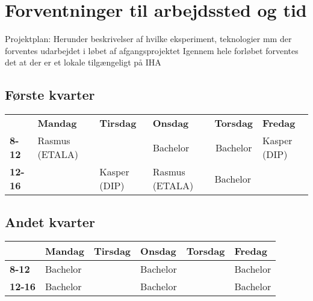 \chapter{Forventninger til arbejdssted og tid}
Projektplan: Herunder beskrivelser af hvilke eksperiment, teknologier mm der forventes udarbejdet i løbet af afgangsprojektet
Igennem hele forløbet forventes det at der er et lokale tilgængeligt på IHA
\section{Første kvarter}
\begin{table}[h]
\begin{tabular}{llllll}
               & \textbf{Mandag} & \textbf{Tirsdag} & \textbf{Onsdag} & \textbf{Torsdag}             & \textbf{Fredag} \\
\textbf{8-12}  & Rasmus (ETALA)  &                  & Bachelor        & \multicolumn{1}{c}{Bachelor} & Kasper (DIP)    \\
\textbf{12-16} &                 & Kasper (DIP)     & Rasmus (ETALA)  & Bachelor                     &                
\end{tabular}
\end{table}

\section{Andet kvarter}
\begin{table}[h]
\begin{tabular}{|l|l|l|l|l|l|}
\hline
               & \textbf{Mandag} & \textbf{Tirsdag} & \textbf{Onsdag} & \textbf{Torsdag}       & \textbf{Fredag} \\ \hline
\textbf{8-12}  & Bachelor        &                  & Bachelor        &  					   & Bachelor        \\ \hline
\textbf{12-16} & Bachelor        &                  & Bachelor        &                        & Bachelor        \\ \hline
\end{tabular}
\end{table}